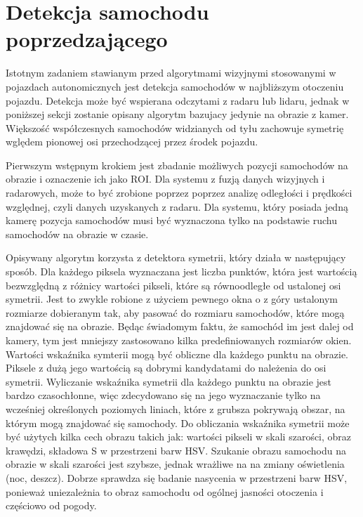 \section{Detekcja samochodu poprzedzającego}
\label{sec:car_general}
Istotnym zadaniem stawianym przed algorytmami wizyjnymi stosowanymi w pojazdach autonomicznych jest detekcja samochodów w najbliższym otoczeniu pojazdu. Detekcja może być wspierana odczytami z radaru lub lidaru, jednak w poniższej sekcji zostanie opisany algorytm bazujacy jedynie na obrazie z kamer. Większość współczesnych samochodów widzianych od tyłu zachowuje symetrię wględem pionowej osi przechodzącej przez środek pojazdu. 

Pierwszym wstępnym krokiem jest zbadanie możliwych pozycji samochodów na obrazie i oznaczenie ich jako ROI. Dla systemu z fuzją danych wizyjnych i radarowych, może to być zrobione poprzez poprzez analizę odległości i prędkości względnej, czyli danych uzyskanych z radaru. Dla systemu, który posiada jedną kamerę pozycja samochodów musi być wyznaczona tylko na podstawie ruchu samochodów na obrazie w czasie.

Opisywany algorytm korzysta z detektora symetrii, który działa w następujący sposób. Dla każdego piksela wyznaczana jest liczba punktów, która jest wartością bezwzględną z różnicy wartości pikseli, które są równoodległe od ustalonej osi symetrii. Jest to zwykle robione z użyciem pewnego okna o z góry ustalonym rozmiarze dobieranym tak, aby pasować do rozmiaru samochodów, które mogą znajdować się na obrazie. Będąc świadomym faktu, że samochód im jest dalej od kamery, tym jest mniejszy zastosowano kilka predefiniowanych rozmiarów okien. Wartości wskaźnika symterii mogą być obliczne dla każdego punktu na obrazie. Piksele z dużą jego wartością są dobrymi kandydatami do należenia do osi symetrii. Wyliczanie wskaźnika symetrii dla każdego punktu na obrazie jest bardzo czasochłonne, więc zdecydowano się na jego wyznaczanie tylko na wcześniej określonych poziomych liniach, które z grubsza pokrywają obszar, na którym mogą znajdować się samochody. Do obliczania wskaźnika symetrii może być użytych kilka cech obrazu takich jak: wartości pikseli w skali szarości, obraz krawędzi, składowa S w przestrzeni barw HSV. Szukanie obrazu samochodu na obrazie w skali szarości jest szybsze, jednak wrażliwe na na zmiany oświetlenia (noc, deszcz). Dobrze sprawdza się badanie nasycenia w przestrzeni barw HSV, ponieważ uniezależnia to obraz samochodu od ogólnej jasności otoczenia i częściowo od pogody.

